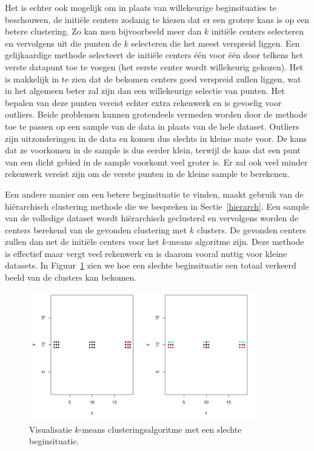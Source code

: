 \documentclass[a4paper,12pt]{article}
\theoremstyle{definition}
\begin{document}
Het is echter ook mogelijk om in plaats van willekeurige beginsituaties te 
beschouwen, de initiële centers zodanig te kiezen dat er een grotere kans is
op een betere clustering. Zo kan men bijvoorbeeld meer dan $k$ initiële 
centers selecteren en vervolgens uit die punten de $k$ selecteren die het 
meest verspreid liggen. Een gelijkaardige methode selecteert de initiële 
centers één voor één door telkens het verste datapunt toe te voegen 
(het eerste center wordt willekeurig gekozen). Het is makkelijk in te zien 
dat de bekomen centers goed verspreid zullen liggen, wat in het algemeen 
beter zal zijn dan een willekeurige selectie van punten. Het bepalen van deze 
punten vereist echter extra rekenwerk en is gevoelig voor outliers. Beide problemen 
kunnen grotendeels vermeden worden door de methode toe te passen op een sample van 
de data in plaats van de hele dataset. Outliers zijn uitzonderingen in de data en 
komen dus slechts in kleine mate voor. De kans dat ze voorkomen in de sample is 
dus eerder klein, terwijl de kans dat een punt van een dicht gebied in de sample 
voorkomt veel groter is. Er zal ook veel minder rekenwerk vereist zijn om de 
verste punten in de kleine sample te berekenen. 

Een andere manier om een betere beginsituatie te vinden, maakt gebruik van de
hiërarchisch clustering methode die we bespreken in Sectie~\ref{hierarch}.
Een sample van de volledige dataset wordt hiërarchisch geclusterd en vervolgens 
worden de centers berekend van de gevonden clustering met $k$ clusters. 
De gevonden centers zullen dan net de initiële centers voor het $k$-means algoritme
zijn. Deze methode is effectief maar vergt veel rekenwerk en is daarom vooral nuttig
voor kleine datasets.
In Figuur~\ref{fig:kmeans_bad} zien we hoe een slechte beginsituatie een totaal
verkeerd beeld van de clusters kan bekomen.

 \begin{figure}[!ht]\centering
  \includegraphics[width=10cm]{kmeans_bad.jpeg}
  \caption{Visualisatie $k$-means clusteringsalgoritme met een slechte beginsituatie.}
  \label{fig:kmeans_bad}
 \end{figure}
\end{document}
